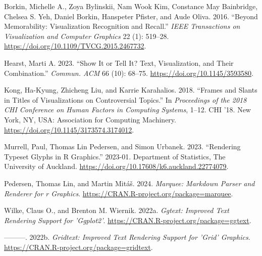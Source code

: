 \hypertarget{refs}{}
\begin{CSLReferences}{1}{0}
\leavevmode{}%
Borkin, Michelle A., Zoya Bylinskii, Nam Wook Kim, Constance May Bainbridge, Chelsea S. Yeh, Daniel Borkin, Hanspeter Pfister, and Aude Oliva. 2016. {``Beyond Memorability: Visualization Recognition and Recall.''} \emph{IEEE Transactions on Visualization and Computer Graphics} 22 (1): 519--28. \url{https://doi.org/10.1109/TVCG.2015.2467732}.

\leavevmode{}%
Hearst, Marti A. 2023. {``Show It or Tell It? Text, Visualization, and Their Combination.''} \emph{Commun. ACM} 66 (10): 68--75. \url{https://doi.org/10.1145/3593580}.

\leavevmode{}%
Kong, Ha-Kyung, Zhicheng Liu, and Karrie Karahalios. 2018. {``Frames and Slants in Titles of Visualizations on Controversial Topics.''} In \emph{Proceedings of the 2018 CHI Conference on Human Factors in Computing Systems}, 1--12. CHI '18. New York, NY, USA: Association for Computing Machinery. \url{https://doi.org/10.1145/3173574.3174012}.

\leavevmode{}%
Murrell, Paul, Thomas Lin Pedersen, and Simon Urbanek. 2023. {``Rendering Typeset Glyphs in {R} Graphics.''} 2023-01. Department of Statistics, The University of Auckland. \url{https://doi.org/10.17608/k6.auckland.22774079}.

\leavevmode{}%
Pedersen, Thomas Lin, and Martin Mitáš. 2024. \emph{Marquee: Markdown Parser and Renderer for r Graphics}. \url{https://CRAN.R-project.org/package=marquee}.

\leavevmode{}%
Wilke, Claus O., and Brenton M. Wiernik. 2022a. \emph{Ggtext: Improved Text Rendering Support for 'Ggplot2'}. \url{https://CRAN.R-project.org/package=ggtext}.

\leavevmode{}%
---------. 2022b. \emph{Gridtext: Improved Text Rendering Support for 'Grid' Graphics}. \url{https://CRAN.R-project.org/package=gridtext}.

\end{CSLReferences}


\address{%
Paul Murrell\\
The University of Auckland\\%
Department of Statistics\\ Auckland, New Zealand\\
%
\url{https://www.stat.auckland.ac.nz/~paul/}\\%
\textit{ORCiD: \href{https://orcid.org/0000-0002-3224-8858}{0000-0002-3224-8858}}\\%
\href{mailto:paul@stat.auckland.ac.nz}{\nolinkurl{paul@stat.auckland.ac.nz}}%
}
